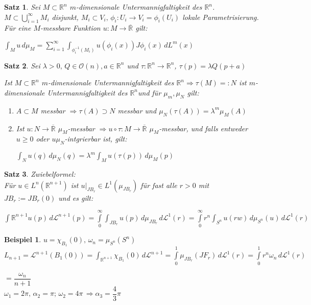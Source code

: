 \documentclass[11pt]{memoir}
\theoremstyle{changebreak}
\newtheorem{Beispiel}{Beispiel}[chapter]
\newtheorem{Satz}{Satz}[chapter]
\newcommand{\umgf}{$m$-dimensionale Untermannigfaltigkeit des $\mathbb R^n$}
\begin{document}
\begin{Satz}
Sei $M \subset \mathbb R^n$ \umgf. $M \subset \bigcup\limits_{i=1}^\infty M_i$ disjunkt, $M_i \subset V_i, \, \phi_i: U_i \rightarrow V_i = \phi_i(U_i)$ lokale Parametrisierung. Für eine $M$-messbare Funktion $u: M \rightarrow \overline{\mathbb R}$ gilt:
\begin{center}
	$\int_M u \, d\mu_M = \sum\limits_{i=1}^\infty \int_{\phi_i^{-1}(M_i)} u(\phi_i(x))J\phi_i(x) \, dL^m(x)$
\end{center}
\end{Satz}

\begin{Satz}
Sei $\lambda > 0, \, Q \in \mathscr O(n), a \in \mathbb R^n$ und $\tau: \mathbb R^n \rightarrow \mathbb R^n$, $\tau(p) = \lambda Q(p+a)$
\par
Ist $M \subset \mathbb R^n$ \umgf $\Rightarrow \tau(M) =: N$ ist \umgf und für $\mu_m, \mu_N$ gilt:
\begin{enumerate}
	\item $A \subset M$ messbar $\Rightarrow \tau(A) \supset N$ messbar und $\mu_N (\tau(A)) = \lambda^m \mu_M (A)$
	\item Ist $u: N \rightarrow \overline{\mathbb R}$ $\mu_M$-messbar $\Rightarrow u \circ \tau: M \rightarrow \overline{\mathbb R}$ $\mu_M$-messbar, und falls entweder $u \geq 0$ oder $u \mu_N$-intgrierbar ist, gilt:
	\begin{center}
		$\int_N u(q) \,d\mu_N(q) = \lambda^m \int_M u(\tau(p))\, d\mu_M(p)$
	\end{center}
\end{enumerate}
\end{Satz}

\begin{Satz}
\emph{Zwiebelformel}: \\
Für $u \in L^n(\mathbb R^{n+1})$ ist $u\lvert_{JB_r} \in L^1(\mu_{JB_r})$ für fast alle $r >0$ mit $JB_r:= JB_r(0)$ und es gilt:
\begin{center}
	$\int{\mathbb R^{n+1}} u(p) \, d\mathscr L^{n+1}(p) = \int\limits_0^\infty \int_{JB_r} u(p) \,d\mu_{JB_r} \,d\mathscr L^1(r) = \int\limits_0^\infty r^n \int_{S^n} u(rw)\,d\mu_{S^n}(u) \,d\mathscr L^1(r)$
\end{center}
\end{Satz}

\begin{Beispiel}
$u = \chi_{B_1}(0),\, \omega_n = \mu_{S^n} (S^n) $\\
$L_{n+1} = \mathscr L^{n+1}(B_1(0)) = \int_{\mathbb R^{n+1}} \chi_{B_1}(0) \,d \mathscr L^{n+1} = \int\limits_0^1 \mu_{JB_r}(JF_r) \,d \mathscr L^1(r) = \int\limits_0^1 r^n \omega_n \, d \mathscr L^1(r) $
\par
$= \dfrac{\omega_n}{n+1}$ \\
$\omega_1 = 2\pi, \, \alpha_2 = \pi; \, \omega_2 = 4\pi \, \Rightarrow \alpha_3 = \dfrac{4}{3}\pi$
\end{Beispiel}
\end{document}
